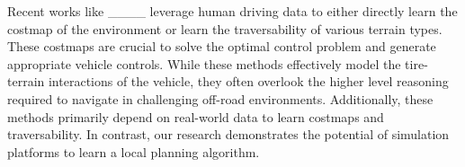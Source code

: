 Recent works like ____
leverage human driving data to either directly learn the costmap of the environment or learn the traversability of various terrain types. 
These costmaps are crucial to solve the optimal control problem and generate appropriate vehicle controls. While these methods effectively model the tire-terrain interactions of the vehicle, they often overlook the higher level reasoning required to navigate in challenging off-road environments. Additionally, these methods primarily depend on real-world data to learn costmaps and traversability. In contrast, our research demonstrates the potential of simulation platforms to learn a local planning algorithm. 

%